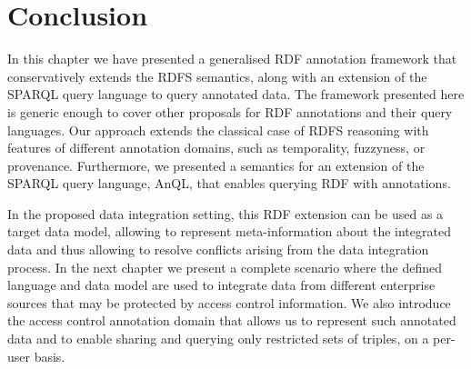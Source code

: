 \section{Conclusion}
\label{sec:conclusion}

In this chapter we have presented a generalised \ac{RDF} annotation framework that conservatively extends the \ac{RDFS}
semantics, along with an extension of the SPARQL query language to query annotated data.
%
The framework presented here is generic enough to cover other proposals for \ac{RDF} annotations and their query
languages.  Our approach extends the classical case of \ac{RDFS} reasoning with features of different annotation
domains, such as temporality, fuzzyness, or provenance. 
%
Furthermore, we presented a semantics for an extension of the SPARQL query language, AnQL, that enables querying
\ac{RDF} with annotations.


In the proposed data integration setting, this \ac{RDF} extension can be used as a target data model, allowing to
represent meta-information about the integrated data and thus allowing to resolve conflicts arising from the data
integration process.
%
In the next chapter we present a complete \usecase scenario where the defined language and data model are used to
integrate data from different enterprise sources that may be protected by access control information.  We also introduce
the access control annotation domain that allows us to represent such annotated data and to enable sharing and querying
only restricted sets of triples, on a per-user basis.


